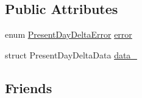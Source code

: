\subsection*{\-Public \-Attributes}
\begin{DoxyCompactItemize}
\item 
enum \hyperlink{day-delta_8h_a1fc28c3187bc8bcf286a214ee7168f8f}{\-Present\-Day\-Delta\-Error} \hyperlink{structDayDelta_a240b38d4510157302ec42efc62ee498d}{error}
\item 
struct \-Present\-Day\-Delta\-Data \hyperlink{structDayDelta_af256f16b6700e43995186eea83db9ebc}{data\-\_\-}
\end{DoxyCompactItemize}
\subsection*{\-Friends}
